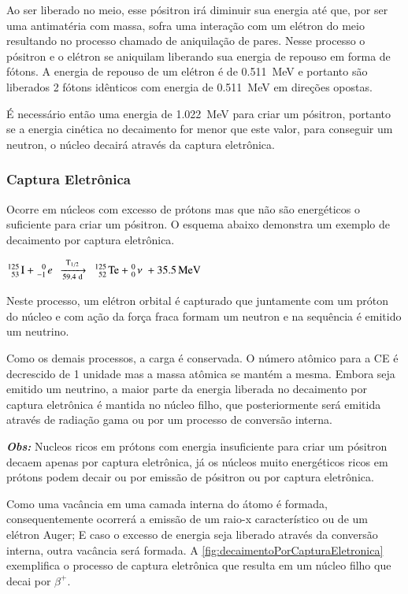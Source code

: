\documentclass[11pt,a4paper]{article}
\newcounter{exemplo}
\begin{document}
    Ao ser liberado no meio, esse pósitron irá diminuir sua energia até que, por ser uma antimatéria com massa, sofra uma interação com um elétron do meio resultando no processo chamado de aniquilação de pares. Nesse processo o pósitron e o elétron se aniquilam liberando sua energia de repouso em forma de fótons. A energia de repouso de um elétron é de \qty{0.511}{MeV} e portanto são liberados 2 fótons idênticos com energia de \qty{0.511}{MeV} em direções opostas. 

    É necessário então uma energia de \qty{1.022}{MeV} para criar um pósitron, portanto se a energia cinética no decaimento for menor que este valor, para conseguir um neutron, o núcleo decairá através da captura eletrônica.

\subsubsection*{Captura Eletrônica}

    Ocorre em núcleos com excesso de prótons mas que não são energéticos o suficiente para criar um pósitron. O esquema abaixo demonstra um exemplo de decaimento por captura eletrônica.

                \begin{center}
                    $\ce{^{125}_{53} I +  ^{0}_{-1} e \; ->[{T_{1/2}}][{59.4 d}] \; ^{125}_{52} Te +  ^{0}_{0} \nu \; + 35.5 MeV}$
                \end{center}

    Neste processo, um elétron orbital é capturado que juntamente com um  próton do núcleo e com ação da força fraca formam um neutron e na sequência é emitido um neutrino.

	Como os demais processos, a carga é conservada. O número atômico para a CE é decrescido de 1 unidade mas a massa atômica se mantém a mesma. Embora seja emitido um neutrino, a maior parte da energia liberada no decaimento por captura eletrônica é mantida no núcleo filho, que posteriormente será emitida através de radiação gama ou por um processo de conversão interna.

    \textbf{\textit{\textcolor{CarnationPink}{Obs:}}} Nucleos ricos em prótons com energia insuficiente para criar um pósitron decaem apenas por captura eletrônica, já os núcleos muito energéticos ricos em prótons podem decair ou por emissão de pósitron ou por captura eletrônica.

    Como uma vacância em uma camada interna do átomo é formada, consequentemente ocorrerá a emissão de um raio-x característico ou de um elétron Auger; E caso o excesso de energia seja liberado através da conversão interna, outra vacância será formada. A \ref{fig:decaimentoPorCapturaEletronica} exemplifica o processo de captura eletrônica que resulta em um núcleo filho que decai por $\beta^+$.
\end{document}
